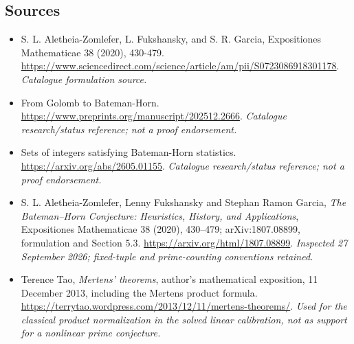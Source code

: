 \documentclass[11pt,a4paper]{article}
\numberwithin{equation}{section}
\begin{document}
\needspace{170mm}
\subsection{Sources}
\begin{itemize}\raggedright
\item[\textnormal{[S1]}]\hypertarget{source:statement:1}{} S. L. Aletheia-Zomlefer, L. Fukshansky, and S. R. Garcia, Expositiones Mathematicae 38 (2020), 430-479.
\url{https://www.sciencedirect.com/science/article/am/pii/S0723086918301178}.
{\small\textit{Catalogue formulation source.}}
\item[\textnormal{[S2]}]\hypertarget{source:statement:2}{} From Golomb to Bateman-Horn.
\url{https://www.preprints.org/manuscript/202512.2666}.
{\small\textit{Catalogue research/status reference; not a proof endorsement.}}
\item[\textnormal{[S3]}]\hypertarget{source:statement:3}{} Sets of integers satisfying Bateman-Horn statistics.
\url{https://arxiv.org/abs/2605.01155}.
{\small\textit{Catalogue research/status reference; not a proof endorsement.}}
\item[\textnormal{[E1]}]\hypertarget{extra:statement:1}{} S. L. Aletheia-Zomlefer,
Lenny Fukshansky and Stephan Ramon Garcia, \emph{The Bateman--Horn Conjecture:
Heuristics, History, and Applications}, Expositiones Mathematicae 38 (2020),
430--479; arXiv:1807.08899, formulation and Section 5.3.
\url{https://arxiv.org/html/1807.08899}.
{\small\textit{Inspected 27 September 2026; fixed-tuple and prime-counting
conventions retained.}}
\item[\textnormal{[E2]}]\hypertarget{extra:statement:2}{} Terence Tao,
\emph{Mertens' theorems}, author's mathematical exposition, 11 December 2013,
including the Mertens product formula.
\url{https://terrytao.wordpress.com/2013/12/11/mertens-theorems/}.
{\small\textit{Used for the classical product normalization in the solved
linear calibration, not as support for a nonlinear prime conjecture.}}
\end{itemize}
\end{document}
